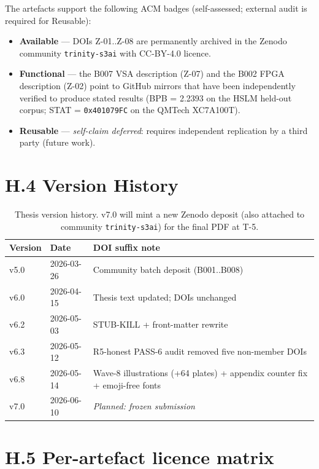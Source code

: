 The artefacts support the following ACM badges (self-assessed; external audit
is required for Reusable):

\begin{itemize}
  \item \textbf{Available} --- DOIs Z-01..Z-08 are permanently archived in
    the Zenodo community \texttt{trinity-s3ai} with CC-BY-4.0 licence.
  \item \textbf{Functional} --- the B007 VSA description (Z-07) and the
    B002 FPGA description (Z-02) point to GitHub mirrors that have been
    independently verified to produce stated results (BPB = 2.2393 on the
    HSLM held-out corpus; STAT = \texttt{0x401079FC} on the QMTech XC7A100T).
  \item \textbf{Reusable} --- \emph{self-claim deferred}: requires
    independent replication by a third party (future work).
\end{itemize}

\section*{H.4 Version History}

\begin{table}[h]
\centering
\begin{tabular}{lll}
\toprule
\textbf{Version} & \textbf{Date} & \textbf{DOI suffix note} \\
\midrule
v5.0 & 2026-03-26 & Community batch deposit (B001..B008) \\
v6.0 & 2026-04-15 & Thesis text updated; DOIs unchanged \\
v6.2 & 2026-05-03 & STUB-KILL + front-matter rewrite \\
v6.3 & 2026-05-12 & R5-honest PASS-6 audit removed five non-member DOIs \\
v6.8 & 2026-05-14 & Wave-8 illustrations (+64 plates) + appendix counter fix + emoji-free fonts \\
v7.0 & 2026-06-10 & \emph{Planned: frozen submission} \\
\bottomrule
\end{tabular}
\caption{Thesis version history. v7.0 will mint a new Zenodo deposit (also
attached to community \texttt{trinity-s3ai}) for the final PDF at T-5.}
\end{table}

\section*{H.5 Per-artefact licence matrix}

